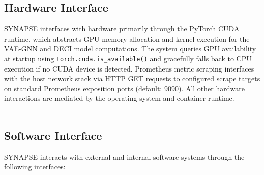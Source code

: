 \subsection{Hardware Interface}

\hspace*{0.3in} SYNAPSE interfaces with hardware primarily through the PyTorch CUDA runtime, which abstracts GPU memory allocation and kernel execution for the VAE-GNN and DECI model computations. The system queries GPU availability at startup using \texttt{torch.cuda.is\_available()} and gracefully falls back to CPU execution if no CUDA device is detected. Prometheus metric scraping interfaces with the host network stack via HTTP GET requests to configured scrape targets on standard Prometheus exposition ports (default: 9090). All other hardware interactions are mediated by the operating system and container runtime.\\\\

\subsection{Software Interface}

\hspace*{0.3in} SYNAPSE interacts with external and internal software systems through the following interfaces:\\\\

